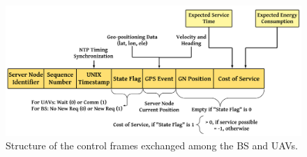 \documentclass[10pt,twocolumn]{IEEEtran}
\begin{document}
\begin{figure} [t]
     \centering
     \includegraphics[width=0.95\linewidth]{figs/Control_Frame_Design.png}
     \vspace{-2mm}
     \caption{Structure of the control frames exchanged among the BS and UAVs.}
     \vspace{-7mm}
     \label{F6}
\end{figure}
\end{document}
